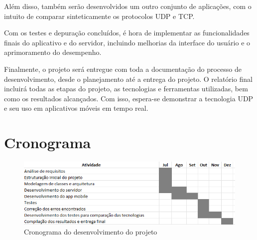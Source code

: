 \documentclass[12pt]{article}
\begin{document}
Além disso, também serão desenvolvidos um outro conjunto de aplicações, com o intuito de comparar sinteticamente os protocolos UDP e TCP.

Com os testes e depuração concluídos, é hora de implementar as funcionalidades finais do aplicativo e do servidor, incluindo melhorias da interface do usuário e o aprimoramento do desempenho.

Finalmente, o projeto será entregue com toda a documentação do processo de desenvolvimento, desde o planejamento até a entrega do projeto. O relatório final incluirá todas as etapas do projeto, as tecnologias e ferramentas utilizadas, bem como os resultados alcançados. Com isso, espera-se demonstrar a tecnologia UDP e seu uso em aplicativos móveis em tempo real.

\section{Cronograma}

\begin{figure}[ht]
\centering
\includegraphics[width=1\textwidth]{cron.png}
\caption{Cronograma do desenvolvimento do projeto}
\label{fig:cronogramafig}
\end{figure}



\end{document}
